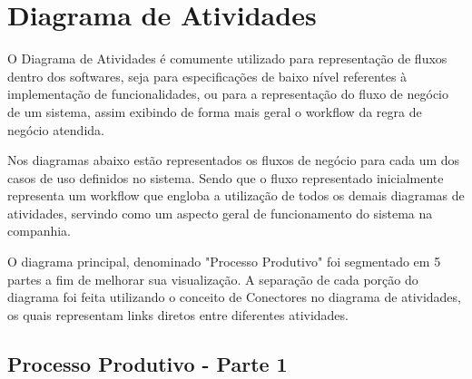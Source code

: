 \documentclass[rascunho,xindy,acronym,symbols]{fei}
\begin{document}
\pagebreak

\section{Diagrama de Atividades} \label{diagramaAtividade}

O Diagrama de Atividades é comumente utilizado para representação de fluxos dentro dos softwares, seja para especificações de baixo nível referentes à implementação de funcionalidades, ou para a representação do fluxo de negócio de um sistema, assim exibindo de forma mais geral o workflow da regra de negócio atendida.

Nos diagramas abaixo estão representados os fluxos de negócio para cada um dos casos de uso definidos no sistema. Sendo que o fluxo representado inicialmente representa um workflow que engloba a utilização de todos os demais diagramas de atividades, servindo como um aspecto geral de funcionamento do sistema na companhia.

O diagrama principal, denominado "Processo Produtivo" foi segmentado em 5 partes a fim de melhorar sua visualização. A separação de cada porção do diagrama foi feita utilizando o conceito de Conectores no diagrama de atividades, os quais representam links diretos entre diferentes atividades.

\subsection{Processo Produtivo - Parte 1}
\end{document}
